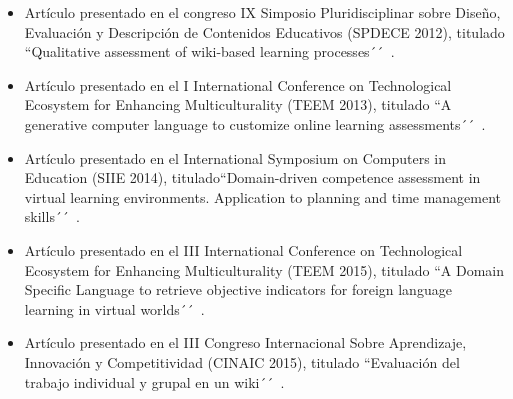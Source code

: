 	\begin{itemize}
	\item Artículo presentado en el congreso IX Simposio Pluridisciplinar sobre Diseño, Evaluación y Descripción de Contenidos Educativos (SPDECE 2012), titulado ``Qualitative assessment of wiki-based learning processes´´~\cite{Balderas:2012}.
	\item Artículo presentado en el I International Conference on Technological Ecosystem for Enhancing Multiculturality (TEEM 2013), titulado ``A generative computer language to customize online learning assessments´´~\cite{balderas2013generative}.
	\item Artículo presentado en el International Symposium on Computers in Education (SIIE 2014), titulado``Domain-driven competence assessment in virtual learning environments. Application to planning and time management skills´´~\cite{balderas2014domain}.
	\item Artículo presentado en el III International Conference on Technological Ecosystem for Enhancing Multiculturality (TEEM 2015), titulado ``A Domain Specific Language to retrieve objective indicators for foreign language learning in virtual worlds´´~\cite{balderas2015domain}.
	\item Artículo presentado en el  III Congreso Internacional Sobre Aprendizaje, Innovación y Competitividad (CINAIC 2015), titulado ``Evaluación del trabajo individual y grupal en un wiki´´~\cite{reinoso2015evaluacion}.
	\end{itemize}


